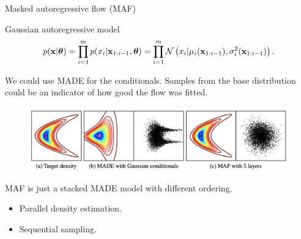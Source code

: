 \begin{frame}{Masked autoregressive flow (MAF)}
	\begin{block}{Gaussian autoregressive model}
		\vspace{-0.7cm}
		\[
			p(\mathbf{x} | \boldsymbol{\theta}) = \prod_{i=1}^m p(x_i | \mathbf{x}_{1:i - 1}, \boldsymbol{\theta}) = \prod_{i=1}^m \mathcal{N} \left(x_i | \mu_i(\mathbf{x}_{1:i-1}), \sigma^2_i (\mathbf{x}_{1:i-1})\right).
		\]
		\vspace{-0.5cm}
	\end{block}
	We could use MADE for the conditionals. 
	Samples from the base distribution could be an indicator of how good the flow was fitted. 
	\vspace{-0.3cm}
	\begin{figure}
		\includegraphics[width=0.95\linewidth]{figs/maf1.png}
	\end{figure}
	MAF is just a stacked MADE model with different ordering.
	\begin{itemize}
		\item Parallel density estimation.
		\item Sequential sampling.
	\end{itemize}
\end{frame}
